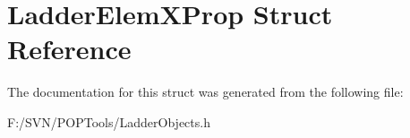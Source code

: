 \hypertarget{struct_ladder_elem_x_prop}{\section{Ladder\-Elem\-X\-Prop Struct Reference}
\label{struct_ladder_elem_x_prop}
}


The documentation for this struct was generated from the following file\-:\begin{DoxyCompactItemize}
\item 
F\-:/\-S\-V\-N/\-P\-O\-P\-Tools/Ladder\-Objects.\-h\end{DoxyCompactItemize}
